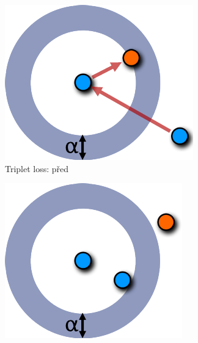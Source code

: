 \documentclass[10pt]{beamer}
\begin{document}
\begin{frame}
	\begin{figure}[h]
		\centering
		\begin{subfigure}[b]{0.18\textwidth}
			\centering
			\includegraphics[width=\textwidth]{images/triplet-magnet-difference/triplet_before.pdf}
			\caption{Triplet loss: před}
		\end{subfigure}
		\hfill
		\begin{subfigure}[b]{0.18\textwidth}
			\centering
			\includegraphics[width=\textwidth]{images/triplet-magnet-difference/triplet_after.pdf}

\end{subfigure}
\end{figure}
\end{frame}
\end{document}
